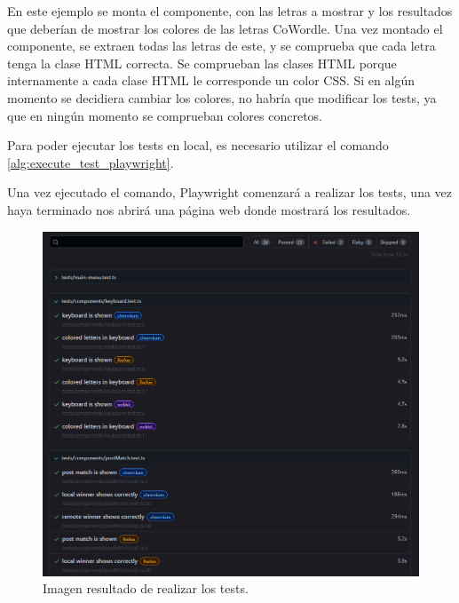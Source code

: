 En este ejemplo se monta el componente, con las letras a mostrar y los resultados que deberían de mostrar los colores de las letras CoWordle. Una vez montado el componente, se extraen todas las letras de este, y se comprueba que cada letra tenga la clase HTML correcta. Se comprueban las clases HTML porque internamente a cada clase HTML le corresponde un color CSS. Si en algún momento se decidiera cambiar los colores, no habría que modificar los tests, ya que en ningún momento se comprueban colores concretos.

Para poder ejecutar los tests en local, es necesario utilizar el comando \ref{alg:execute_test_playwright}.


Una vez ejecutado el comando, Playwright comenzará a realizar los tests, una vez haya terminado nos abrirá una página web donde mostrará los resultados.

\begin{figure}[H]
	\centering
	\includegraphics[clip=true, width=\textwidth]{images/tests/playwright_web.png}
	\caption{Imagen resultado de realizar los tests.}
	\label{fig:playwright_tests_result}
\end{figure}

